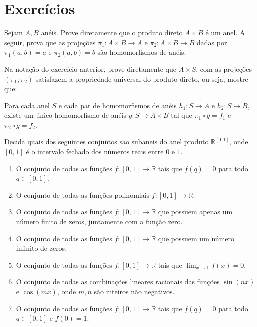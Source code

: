 \section{Exercícios}

\begin{exer}\label{exer:prod_anel}
    Sejam $A, B$ anéis.
    Prove diretamente que o produto direto $A\times B$ é um anel.
    A seguir, prova que as projeções $\pi_1:A\times B\rightarrow A$ e $\pi_2:A\times B\rightarrow B$ dadas por $\pi_1(a, b)=a$ e $\pi_2(a, b)=b$ são homomorfismos de anéis.
\end{exer}

\begin{exer}
    Na notação do exercício anterior, prove diretamente que $A\times S$, com as projeções $(\pi_1, \pi_2)$ satisfazem a propriedade universal do produto direto, ou seja, mostre que:

    Para cada anel $S$ e cada par de homomorfismos de anéis $h_1:S\rightarrow A$ e $h_2:S\rightarrow B$, existe um único homomorfismo de anéis $g:S\rightarrow A\times B$ tal que $\pi_1\circ g=f_1$ e $\pi_2\circ g=f_2$.
\end{exer}
\begin{exer}
Decida quais dos seguintes conjuntos sao subaneis do anel produto $\mathbb R^{[0, 1]}$, onde $[0, 1]$ é o intervalo fechado dos números reais entre $0$ e $1$.
\begin{enumerate}[label=\alph*)]
    \item O conjunto de todas as funções $f:[0, 1]\rightarrow \mathbb R$ tais que $f(q)=0$ para todo $q\in [0, 1]$.
    \item O conjunto de todas as funções polinomiais $f:[0, 1]\rightarrow \mathbb R$.
    \item O conjunto de todas as funções $f:[0, 1]\rightarrow \mathbb R$ que possuem apenas um número finito de zeros, juntamente com a função zero.
    \item O conjunto de todas as funções $f:[0, 1]\rightarrow \mathbb R$ que possuem um número infinito de zeros.
    \item O conjunto de todas as funções $f:[0, 1]\rightarrow \mathbb R$ tais que $\lim_{x\rightarrow 1}f(x)=0$.
    \item O conjunto de todas as combinações lineares racionais das funções $\sin(nx)$ e $\cos(mx)$, onde $m,n$ são inteiros não negativos.
    \item O conjunto de todas as funções $f:[0, 1]\rightarrow \mathbb R$ tais que $f(q)=0$ para todo $q\in [0, 1]$ e $f(0)=1$.
\end{enumerate}
\end{exer}

